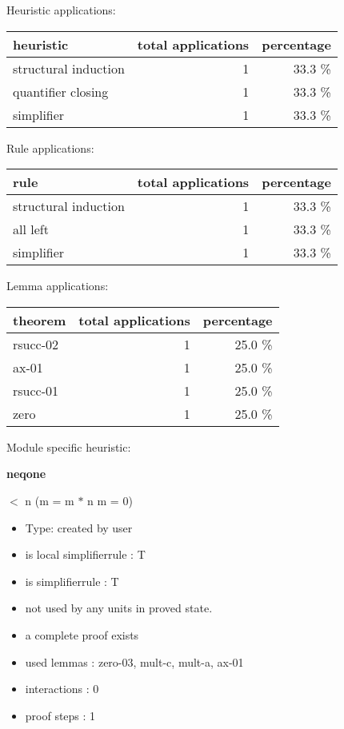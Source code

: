 \documentclass[a4paper]{article}
\begin{document}
\medskip


Heuristic applications:

\begin{supertabular}{l|r|r}
heuristic	& total applications & percentage \\ \hline
structural induction & 1 & 33.3 \% \\
quantifier closing & 1 & 33.3 \% \\
simplifier & 1 & 33.3 \% \\

\end{supertabular}

Rule applications:

\begin{supertabular}{l|r|r}
rule	        & total applications & percentage \\ \hline
structural induction & 1 & 33.3 \% \\
all left & 1 & 33.3 \% \\
simplifier & 1 & 33.3 \% \\

\end{supertabular}

Lemma applications:

\begin{supertabular}{l|r|r}
theorem	        & total applications & percentage \\ \hline
rsucc-02 & 1 & 25.0 \% \\
ax-01 & 1 & 25.0 \% \\
rsucc-01 & 1 & 25.0 \% \\
zero & 1 & 25.0 \% \\

\end{supertabular}

Module specific heuristic:

\pagebreak

{\LARGE\bf neqone}\label{lemma-neqone}

\medskip

  $<$ n \Imp (m = m $*$ n \Equiv m = 0)

\begin{itemize}

\item Type: created by user

\item is local simplifierrule : T
\item is simplifierrule : T
\item not used by any units in proved state.
\item       a complete proof exists
\item       used lemmas  : zero-03, mult-c, mult-a, ax-01
\item       interactions : 0
\item       proof steps  : 1
\end{itemize}
\end{document}
